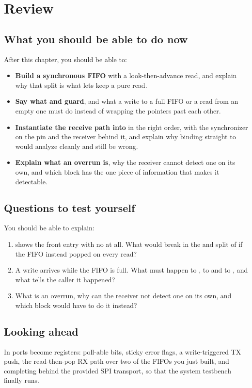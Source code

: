
\section{Review}
\label{c4:sec:review}

\subsection*{What you should be able to do now}
After this chapter, you should be able to:
\begin{itemize}
  \item \textbf{Build a synchronous FIFO} with a look-then-advance read, and explain why that split
    is what lets  keep  a pure read.
  \item \textbf{Say what  and  guard}, and what a write to a full FIFO or a
    read from an empty one must do instead of wrapping the pointers past each other.
  \item \textbf{Instantiate the receive path into } in the right order, with the
    synchronizer on the pin and the receiver behind it, and explain why binding  straight
    to  would analyze cleanly and still be wrong.
  \item \textbf{Explain what an overrun is}, why the receiver cannot detect one on its own, and
    which block has the one piece of information that makes it detectable.
\end{itemize}

\subsection*{Questions to test yourself}
You should be able to explain:
\begin{enumerate}
  \item {} shows the front entry with no  at all. What would break in the
     and  split of  if the FIFO instead popped on every read?
  \item A write arrives while the FIFO is full. What must happen to , to  and
    to , and what tells the caller it happened?
  \item What is an overrun, why can the receiver not detect one on its own, and which block would
    have to do it instead?
\end{enumerate}

\subsection*{Looking ahead}
In  ports become registers: poll-able  bits, sticky error flags, a
write-triggered TX push, the read-then-pop RX path over two of the FIFOs you just built, and
completing  behind the provided SPI transport, so that the system testbench finally
runs.
